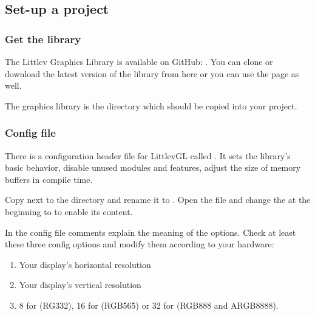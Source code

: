 \documentclass[letterpaper,10pt,english]{sphinxmanual}
\begin{document}
\subsection{Set-up a project}
\label{\detokenize{porting/project:set-up-a-project}}\label{\detokenize{porting/project::doc}}

\subsubsection{Get the library}
\label{\detokenize{porting/project:get-the-library}}
The Littlev Graphics Library is available on GitHub: .
You can clone or download the latest version of the library from here or you can use the  page as well.

The graphics library is the  directory which should be copied into your project.


\subsubsection{Config file}
\label{\detokenize{porting/project:config-file}}
There is a configuration header file for LittlevGL called . It sets the library’s basic behavior, disable unused modules and features, adjust the size of memory buffers in compile time.

Copy  next to the  directory and rename it to . Open the file and change the  at the beginning to  to enable its content.

In the config file comments explain the meaning of the options. Check at least these three config options and modify them according to your hardware:
\begin{enumerate}
\item {} 
 Your display’s horizontal resolution

\item {} 
 Your display’s vertical resolution

\item {} 
 8 for (RG332), 16 for (RGB565) or 32 for (RGB888 and ARGB8888).

\end{enumerate}
\end{document}
